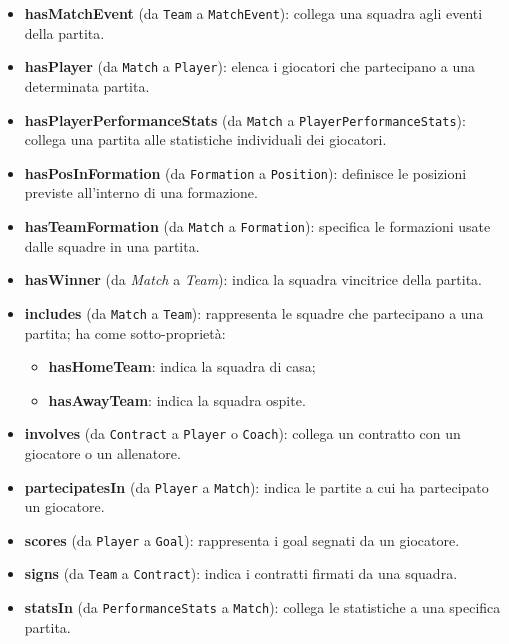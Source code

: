 \documentclass[11pt]{report} %
\begin{document}
\begin{itemize}[leftmargin=*]
\begin{itemize}
\item \textbf{hasMatchEvent} (da \texttt{Team} a \texttt{MatchEvent}): collega una squadra agli eventi della partita.

\item \textbf{hasPlayer} (da \texttt{Match} a \texttt{Player}): elenca i giocatori che partecipano a una determinata partita.

\item \textbf{hasPlayerPerformanceStats} (da \texttt{Match} a \texttt{PlayerPerformanceStats}): collega una partita alle statistiche individuali dei giocatori.

\item \textbf{hasPosInFormation} (da \texttt{Formation} a \texttt{Position}): definisce le posizioni previste all'interno di una formazione.


\item \textbf{hasTeamFormation} (da \texttt{Match} a \texttt{Formation}): specifica le formazioni usate dalle squadre in una partita.

\item \textbf{hasWinner} (da \textit{Match} a \textit{Team}): indica la squadra vincitrice della partita.

\item \textbf{includes} (da \texttt{Match} a \texttt{Team}): rappresenta le squadre che partecipano a una partita; ha come sotto-proprietà:
\begin{itemize}
    \item \textbf{hasHomeTeam}: indica la squadra di casa;
    \item \textbf{hasAwayTeam}: indica la squadra ospite.
\end{itemize}

\item \textbf{involves} (da \texttt{Contract} a \texttt{Player} o \texttt{Coach}): collega un contratto con un giocatore o un allenatore.

\item \textbf{partecipatesIn} (da \texttt{Player} a \texttt{Match}): indica le partite a cui ha partecipato un giocatore.

\item \textbf{scores} (da \texttt{Player} a \texttt{Goal}): rappresenta i goal segnati da un giocatore.

\item \textbf{signs} (da \texttt{Team} a \texttt{Contract}): indica i contratti firmati da una squadra.

\item \textbf{statsIn} (da \texttt{PerformanceStats} a \texttt{Match}): collega le statistiche a una specifica partita.


\end{itemize}
\end{itemize}
\end{document}
